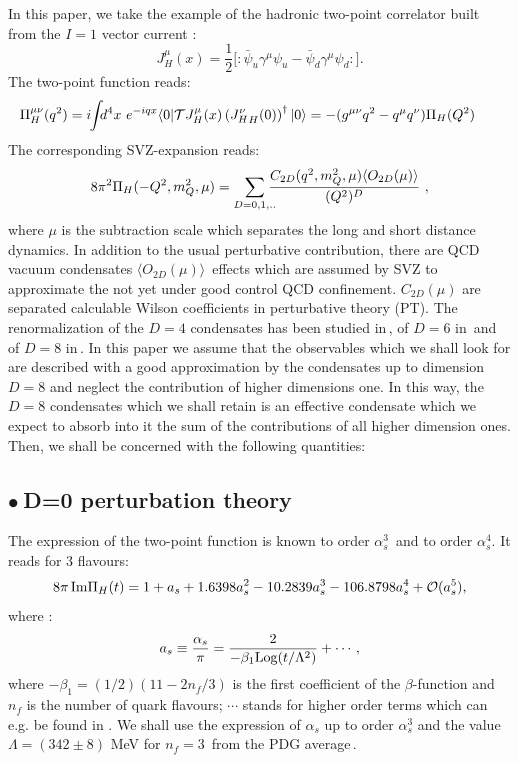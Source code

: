 \documentclass[review]{elsarticle}
\def\beq{\begin{equation}}
\def\eeq{\end{equation}}
\def\ga{\left(}
\def\dr{\right)}
\def\la{\langle}
\def\ra{\rangle}
\def\b{$\bullet~$}
\begin{document}
 In this paper, we take  the example of the hadronic two-point correlator built from the $I=1$  vector current :
\beq
 J^\mu_H(x)=\frac{1}{2}{[}: \bar\psi_u\gamma^\mu\psi_u-\bar\psi_d\gamma^\mu\psi_d:{]}.
 \eeq
The two-point function reads: 
\beq
\hspace*{-0.6cm} \Pi^{\mu\nu}_H(q^2)=i\hspace*{-0.1cm}\int \hspace*{-0.15cm}d^4x ~e^{-iqx}\la 0\vert {\cal T} {J^\mu_H}(x)\ga {J^\nu_H}_H(0)\dr^\dagger \vert 0\ra=-(g^{\mu\nu}q^2-q^\mu q^\nu)\Pi_H(Q^2)
 \label{eq:2-point}
 \eeq
The corresponding SVZ-expansion reads:
\beq
8\pi^2\Pi_H(-Q^2,m_Q^2,\mu)=\sum_{D=0,1,..}\hspace*{-0.25cm}\frac{C_{2D}(q^2,m_Q^2,\mu)\la O_{2D}(\mu)\ra}{(Q^2)^{D}}~, 
\label{eq:ope}
\eeq
where $\mu$ is the subtraction scale which separates the long and short distance dynamics. In addition to the usual perturbative contribution, there are QCD vacuum condensates $\la O_{2D}(\mu)\ra$\ effects which are assumed by SVZ to approximate  the not yet under good control QCD confinement.  $C_{2D}(\mu)$ are separated calculable Wilson coefficients in perturbative theory (PT).  The renormalization of the $D=4$ condensates has been studied in\,\cite{TARRACH,ESPRIU}, of $D=6$ in\,\cite{SNTARRACH} and of $D=8$ in\,\cite{BAGAN}.  In this paper we assume that the observables which we shall look for are described with a good approximation by the condensates up to dimension $D=8$ and neglect the contribution of higher dimensions one. In this way, the $D=8$ condensates which we shall retain is an effective condensate which we expect to absorb into it the sum of the contributions of all higher dimension ones. Then, we shall be concerned with the following quantities:
\subsection*{\b D=0 perturbation theory}
The expression of the two-point function is known to order $\alpha_s^3$\,\cite{LARIN} and to order $\alpha_s^4$\cite{CHET4}. It reads for 3 flavours:
\beq
8{\pi}\,{\rm Im}\Pi_H(t)=  1+a_s+1.6398a_s^2-10.2839a_s^3-106.8798a_s^4+{\cal O}(a_s^5),
\label{eq:pt}
\eeq
where : 
\beq
a_s\equiv \frac{\alpha_s}{\pi}=\frac{2}{-\beta_1{\rm Log} (t/\Lambda^2)}+\cdots,
\eeq 
where $-\beta_1=(1/2)(11-2n_f/3)$ is the first coefficient of the $\beta$-function and $n_f$ is the number of quark flavours;  $\cdots$ stands for higher order terms which can e.g. be found in \cite{SNB2}. We shall use the expression of $\alpha_s$ up to order $\alpha_s^3$ and the value $\Lambda =(342\pm 8)$ MeV  for  $n_f=3$\:\, from the PDG average\,\cite{PDG}.
\end{document}
